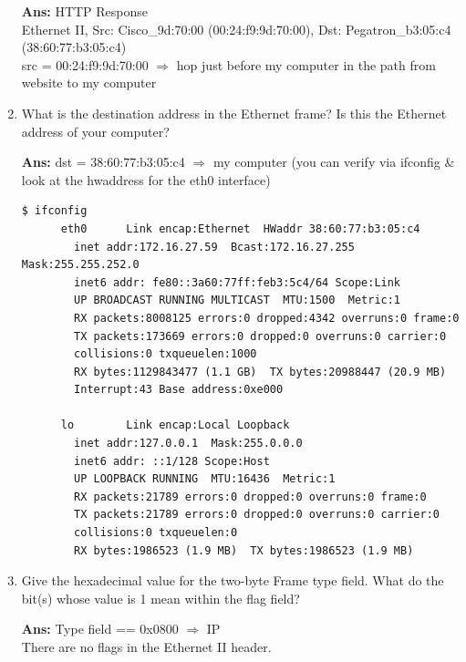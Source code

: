 \documentclass[a4,11pt]{article}
\newenvironment{que}
{ \color{ForestGreen}
  \begin{question}
}
{ \end{question} }
\newenvironment{sol}
{ \color{Black}
  \begin{solution}
}
{ \end{solution} }
\begin{document}
\begin{enumerate}
  \begin{sol}
   \textbf{Ans:} HTTP Response \\
    Ethernet II, Src: Cisco\_9d:70:00 (00:24:f9:9d:70:00), Dst: Pegatron\_b3:05:c4 (38:60:77:b3:05:c4) \\
    src = 00:24:f9:9d:70:00 $\Rightarrow$ hop just before my computer in the path from website to my computer  
  \end{sol}
  
  \item 
  \begin{que}
   What is the destination address in the Ethernet frame? Is this the Ethernet address of your computer?
  \end{que}

  \begin{sol}
 \textbf{Ans:}   dst = 38:60:77:b3:05:c4 $\Rightarrow$ my computer (you can verify via ifconfig \& look at the hwaddress for the eth0 interface)
    \begin{adjustwidth}{-2cm}{}
    \begin{lstlisting}[style=bash]
      $ ifconfig
      eth0      Link encap:Ethernet  HWaddr 38:60:77:b3:05:c4  
		inet addr:172.16.27.59  Bcast:172.16.27.255  Mask:255.255.252.0
		inet6 addr: fe80::3a60:77ff:feb3:5c4/64 Scope:Link
		UP BROADCAST RUNNING MULTICAST  MTU:1500  Metric:1
		RX packets:8008125 errors:0 dropped:4342 overruns:0 frame:0
		TX packets:173669 errors:0 dropped:0 overruns:0 carrier:0
		collisions:0 txqueuelen:1000 
		RX bytes:1129843477 (1.1 GB)  TX bytes:20988447 (20.9 MB)
		Interrupt:43 Base address:0xe000 

      lo        Link encap:Local Loopback  
		inet addr:127.0.0.1  Mask:255.0.0.0
		inet6 addr: ::1/128 Scope:Host
		UP LOOPBACK RUNNING  MTU:16436  Metric:1
		RX packets:21789 errors:0 dropped:0 overruns:0 frame:0
		TX packets:21789 errors:0 dropped:0 overruns:0 carrier:0
		collisions:0 txqueuelen:0 
		RX bytes:1986523 (1.9 MB)  TX bytes:1986523 (1.9 MB)
    \end{lstlisting}   
    \end{adjustwidth}
  \end{sol}

  \item
  \begin{que}
    Give the hexadecimal value for the two-byte Frame type field. What do the bit(s) whose value is 1 mean within the flag field?   
  \end{que}

   \begin{sol}
  \textbf{Ans:}  Type field == 0x0800 $\Rightarrow$ IP \\
    There are no flags in the Ethernet II header.   
   \end{sol}
   
\end{enumerate}
\pagebreak
\end{document}
